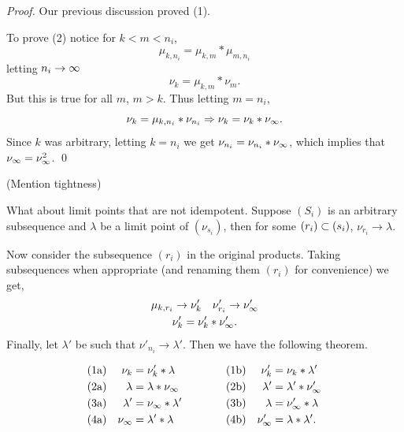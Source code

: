 \begin{proof}  Our previous discussion proved (1).

To prove (2) notice for $k < m < n_i$,
\[
     \mu_{k,n_i} = \mu_{k,m} * \mu_{m,n_i}
\]
letting $n_i \to \infty$
\[
     \nu_k = \mu_{k,m} * \nu_m.
\]
But this is true for all $m$, $m > k$.  
Thus letting $m = n_i$,
\[
     \nu_k = \mu_{k,n_i} * \nu_{n_i} \Rightarrow \nu_k = \nu_k * \nu_\infty.
\]
Since $k$ was arbitrary, letting $k = n_i$ we get $\nu_{n_i} = \nu_{n_i} * \nu_\infty$, which implies that $\nu_\infty = \nu^2_\infty$. 
\qed
\end{proof}

(Mention tightness)

What about limit points that are not idempotent.  
Suppose $(S_i)$ is an arbitrary subsequence and $\lambda$ be a limit point of $(\nu_{s_i})$, then for some $(r_i) \subset (s_i)$, $\nu_{r_i} \to \lambda$.

     Now consider the subsequence $(r_i)$ in the original products.
Taking subsequences when appropriate (and renaming them $(r_i)$ for
convenience) we get,
\[
\begin{gathered}
     \mu_{k,r_i} \to \nu'_k \quad \nu'_{r_i} \to \nu'_\infty       \\
     \nu'_k = \nu'_k * \nu'_\infty.
\end{gathered}
\]
Finally, let $\lambda'$ be such that $\nu'_{n_i} \to \lambda'$.  
Then we have the following theorem.

\begin{theorem}		\label{thm:3.6}
\[
\begin{alignedat}{4}
     &\hbox{{\normalfont(1a)}} &\quad \nu_k &= \nu'_k * \lambda &\qquad \qquad
               &\hbox{{\normalfont(1b)}} &\quad \nu'_k &= \nu_k * \lambda'      \\
     &\hbox{{\normalfont(2a)}} &\quad \lambda &= \lambda * \nu_\infty &\quad \qquad
               &\hbox{{\normalfont(2b)}} &\quad \lambda' &= \lambda' * \nu'_\infty      \\
     &\hbox{{\normalfont(3a)}} &\quad \lambda' &= \nu_\infty * \lambda' &\quad \qquad
               &\hbox{{\normalfont(3b)}} &\quad \lambda &= \nu'_\infty * \lambda        \\
     &\hbox{{\normalfont(4a)}} &\quad \nu_\infty &= \lambda' * \lambda &\quad \qquad
               &\hbox{{\normalfont(4b)}} &\quad \nu'_\infty &= \lambda * \lambda'.      \\
\end{alignedat}
\]
\end{theorem}

